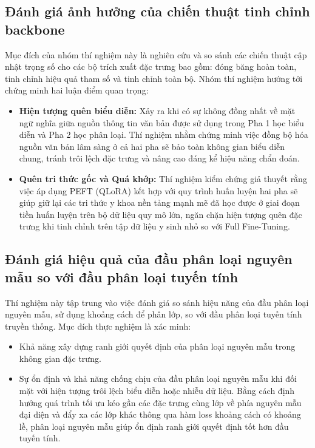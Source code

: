 \subsection{Đánh giá ảnh hưởng của chiến thuật tinh chỉnh backbone}
Mục đích của nhóm thí nghiệm này là nghiên cứu và so sánh các chiến thuật cập nhật trọng số cho các bộ trích xuất đặc trưng bao gồm: đóng băng hoàn toàn, tinh chỉnh hiệu quả tham số và tinh chỉnh toàn bộ. Nhóm thí nghiệm hướng tới chứng minh hai luận điểm quan trọng:
\begin{itemize}
    \item \textbf{Hiện tượng quên biểu diễn:} Xảy ra khi có sự không đồng nhất về mặt ngữ nghĩa giữa nguồn thông tin văn bản được sử dụng trong Pha 1 học biểu diễn và Pha 2 học phân loại. Thí nghiệm nhằm chứng minh việc đồng bộ hóa nguồn văn bản lâm sàng ở cả hai pha sẽ bảo toàn không gian biểu diễn chung, tránh trôi lệch đặc trưng và nâng cao đáng kể hiệu năng chẩn đoán.
    \item \textbf{Quên tri thức gốc và Quá khớp:} Thí nghiệm kiểm chứng giả thuyết rằng việc áp dụng PEFT (QLoRA) kết hợp với quy trình huấn luyện hai pha sẽ giúp giữ lại các tri thức y khoa nền tảng mạnh mẽ đã học được ở giai đoạn tiền huấn luyện trên bộ dữ liệu quy mô lớn, ngăn chặn hiện tượng quên đặc trưng khi tinh chỉnh trên tập dữ liệu y sinh nhỏ so với Full Fine-Tuning.
\end{itemize}

\subsection{Đánh giá hiệu quả của đầu phân loại nguyên mẫu so với đầu phân loại tuyến tính}
Thí nghiệm này tập trung vào việc đánh giá so sánh hiệu năng của đầu phân loại nguyên mẫu, sử dụng khoảng cách để phân lớp, so với đầu phân loại tuyến tính truyền thống. Mục đích thực nghiệm là xác minh:
\begin{itemize}
    \item Khả năng xây dựng ranh giới quyết định của phân loại nguyên mẫu trong không gian đặc trưng.
    \item Sự ổn định và khả năng chống chịu của đầu phân loại nguyên mẫu khi đối mặt với hiện tượng trôi lệch biểu diễn hoặc nhiễu dữ liệu. Bằng cách định hướng quá trình tối ưu kéo gần các đặc trưng cùng lớp về phía nguyên mẫu đại diện và đẩy xa các lớp khác thông qua hàm loss khoảng cách có khoảng lề, phân loại nguyên mẫu giúp ổn định ranh giới quyết định tốt hơn đầu tuyến tính.
\end{itemize}

